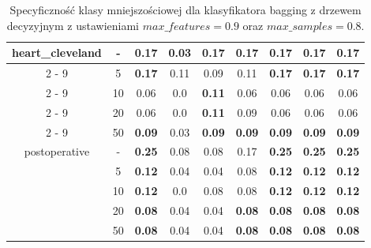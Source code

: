 \begin{table}[H]
\begin{center}
{\begin{tabular}{c|c|ccccccc}
				\hline%
				\multirow{5}{*}{heart\_cleveland}&{-}&\textbf{0.17}&0.03&\textbf{0.17}&\textbf{0.17}&\textbf{0.17}&\textbf{0.17}&\textbf{0.17}\\%
				\cline{2%
					-%
					9}%
				&5&\textbf{0.17}&0.11&0.09&0.11&\textbf{0.17}&\textbf{0.17}&\textbf{0.17}\\%
				\cline{2%
					-%
					9}%
				&10&0.06&0.0&\textbf{0.11}&0.06&0.06&0.06&0.06\\%
				\cline{2%
					-%
					9}%
				&20&0.06&0.0&\textbf{0.11}&0.09&0.06&0.06&0.06\\%
				\cline{2%
					-%
					9}%
				&50&\textbf{0.09}&0.03&\textbf{0.09}&\textbf{0.09}&\textbf{0.09}&\textbf{0.09}&\textbf{0.09}\\%
				\hline%
				\multirow{5}{*}{postoperative}&{-}&\textbf{0.25}&0.08&0.08&0.17&\textbf{0.25}&\textbf{0.25}&\textbf{0.25}\\%
				\cline{2%
					-%
					9}%
				&5&\textbf{0.12}&0.04&0.04&0.08&\textbf{0.12}&\textbf{0.12}&\textbf{0.12}\\%
				\cline{2%
					-%
					9}%
				&10&\textbf{0.12}&0.0&0.08&0.08&\textbf{0.12}&\textbf{0.12}&\textbf{0.12}\\%
				\cline{2%
					-%
					9}%
				&20&\textbf{0.08}&0.04&0.04&\textbf{0.08}&\textbf{0.08}&\textbf{0.08}&\textbf{0.08}\\%
				\cline{2%
					-%
					9}%
				&50&\textbf{0.08}&0.04&0.04&\textbf{0.08}&\textbf{0.08}&\textbf{0.08}&\textbf{0.08}\\%
				\hline%
			\end{tabular}
			}
			\caption{Specyficzność klasy mniejszościowej dla klasyfikatora bagging z drzewem decyzyjnym z ustawieniami $max\_features = 0.9$ oraz $max\_samples = 0.8$.}
			\label{baggingdrzewo2spec2}
		\end{center}
	\end{table}

	
